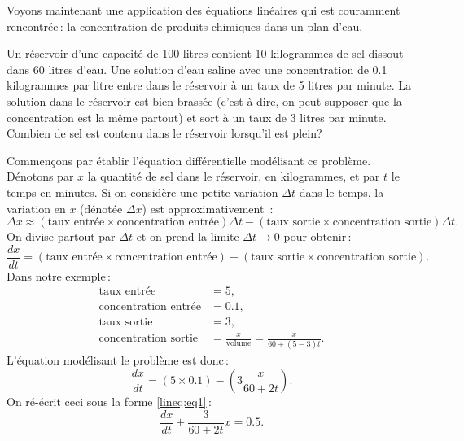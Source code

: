 \begin{example}
Voyons maintenant une application des équations linéaires qui est couramment rencontrée\,: la concentration de produits chimiques dans un plan d'eau.

\begin{mywrapfigsimp}{1.60in}{1.65in}
\noindent
{}
\end{mywrapfigsimp}
Un réservoir d'une capacité de 100 litres contient 10 kilogrammes de sel dissout dans 60 litres d'eau.  Une solution d'eau saline avec une concentration de 0.1 kilogrammes par litre entre dans le réservoir à un taux de 5 litres par minute. La solution dans le réservoir est bien brassée (c'est-à-dire, on peut supposer que la concentration est la même partout) et sort à un taux de 3 litres par minute.  Combien de sel est contenu dans le réservoir lorsqu'il est plein?

Commençons par établir l'équation différentielle modélisant ce problème.  Dénotons par $x$ la quantité de sel dans le réservoir, en kilogrammes,  et par $t$ le temps en minutes.  Si on considère une petite variation $\Delta t$ dans le temps, la variation en $x$ (dénotée $\Delta x$) est approximativement \,: 
\begin{equation*}
\Delta x \approx
(\text{taux entrée} \times \text{concentration entrée}) \Delta t - 
(\text{taux sortie} \times \text{concentration sortie}) \Delta t .
\end{equation*}
On divise partout par $\Delta t$ et on prend la limite $\Delta t \to 0$ pour obtenir\,: 
\begin{equation*}
\frac{dx}{dt} =
(\text{taux entrée} \times \text{concentration entrée})  - 
(\text{taux sortie} \times \text{concentration sortie}) .
\end{equation*}
Dans notre exemple\,:
\begin{align*}
\text{taux entrée} &= 5 , \\
\text{concentration entrée} &= 0.1 , \\
\text{taux sortie} &= 3 , \\
\text{concentration sortie} &= \frac{x}{\text{volume}} = \frac{x}{60+(5-3)t} .
\end{align*}
L'équation modélisant le problème est donc\,: 
\begin{equation*}
\frac{dx}{dt} =
(5 \times 0.1)  - 
\left(3 \frac{x}{60+2t}\right) .
\end{equation*}
On ré-écrit ceci sous la forme \eqref{lineq:eq1}\,:
\begin{equation*}
\frac{dx}{dt} +
\frac{3}{60+2t} x
=
0.5 .
\end{equation*}


\end{example}
